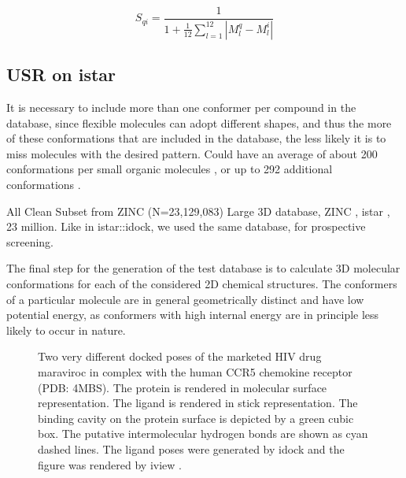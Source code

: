 \begin{equation}
S_{qi}=\frac{1}{1+\frac{1}{12}\sum_{l=1}^{12}|M_l^q-M_l^i|}
\label{usr:usrcat}
\end{equation}

\subsection{USR on istar}

It is necessary to include more than one conformer per compound in the database, since flexible molecules can adopt different shapes, and thus the more of these conformations that are included in the database, the less likely it is to miss molecules with the desired pattern. Could have an average of about 200 conformations per small organic molecules \citep{1332}, or up to 292 additional conformations \citep{1280}.

All Clean Subset from ZINC (N=23,129,083)
Large 3D database, ZINC \citep{532,1178}, istar \citep{1362}, 23 million.
Like in istar::idock, we used the same database, for prospective screening.

The final step for the generation of the test database is to calculate 3D molecular conformations for each of the considered 2D chemical structures. The conformers of a particular molecule are in general geometrically distinct and have low potential energy, as conformers with high internal energy are in principle less likely to occur in nature.

\begin{figure}
\centering
{}
\caption{Two very different docked poses of the marketed HIV drug maraviroc in complex with the human CCR5 chemokine receptor (PDB: 4MBS). The protein is rendered in molecular surface representation. The ligand is rendered in stick representation. The binding cavity on the protein surface is depicted by a green cubic box. The putative intermolecular hydrogen bonds are shown as cyan dashed lines. The ligand poses were generated by idock \citep{1153} and the figure was rendered by iview \citep{1366}.}
\label{usr:MRV}
\end{figure}

